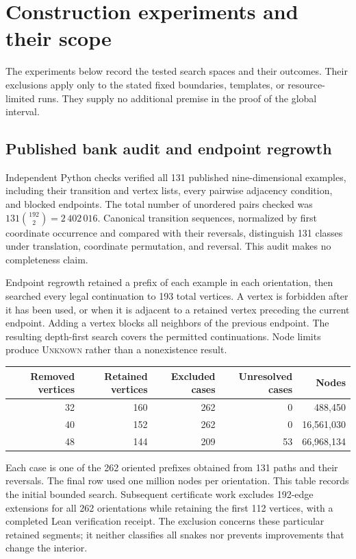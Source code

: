 \documentclass[11pt,a4paper]{article}
\theoremstyle{definition}
\theoremstyle{remark}
\begin{document}
\section{Construction experiments and their scope}\label{app:experiments}
The experiments below record the tested search spaces and their outcomes. Their exclusions apply only to the stated fixed boundaries, templates, or resource-limited runs. They supply no additional premise in the proof of the global interval.

\subsection{Published bank audit and endpoint regrowth}
Independent Python checks verified all 131 published nine-dimensional examples, including their transition and vertex lists, every pairwise adjacency condition, and blocked endpoints. The total number of unordered pairs checked was $131\binom{192}{2}=2\,402\,016$. Canonical transition sequences, normalized by first coordinate occurrence and compared with their reversals, distinguish 131 classes under translation, coordinate permutation, and reversal. This audit makes no completeness claim.

Endpoint regrowth retained a prefix of each example in each orientation, then searched every legal continuation to 193 total vertices. A vertex is forbidden after it has been used, or when it is adjacent to a retained vertex preceding the current endpoint. Adding a vertex blocks all neighbors of the previous endpoint. The resulting depth-first search covers the permitted continuations. Node limits produce \textsc{Unknown} rather than a nonexistence result.
\begin{center}\begin{tabular}{rrrrr}
\toprule
Removed vertices & Retained vertices & Excluded cases & Unresolved cases & Nodes\\\midrule
32&160&262&0&488,450\\
40&152&262&0&16,561,030\\
48&144&209&53&66,968,134\\\bottomrule
\end{tabular}\end{center}
Each case is one of the 262 oriented prefixes obtained from 131 paths and their reversals. The final row used one million nodes per orientation. This table records the initial bounded search. Subsequent certificate work excludes 192-edge extensions for all 262 orientations while retaining the first 112 vertices, with a completed Lean verification receipt. The exclusion concerns these particular retained segments; it neither classifies all snakes nor prevents improvements that change the interior.
\end{document}

